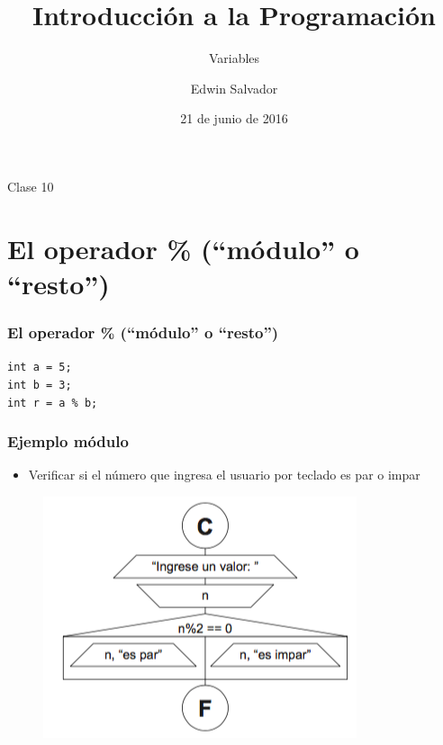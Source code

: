 \documentclass[handout]{beamer}
\title{Introducción a la Programación}
\subtitle{Variables}
\author{Edwin Salvador}
\date{21 de junio de 2016}
\begin{document}
  \begin{frame}
    \titlepage
    \centerline{Clase 10}
  \end{frame}
  

\section{El operador \% (``módulo'' o ``resto'')} %
\label{sec:el_operador__modulo_o_resto_}
\begin{frame}[t]\frametitle{El operador \% (``módulo'' o ``resto'')}
    
\texttt{int a = 5;}\\
\texttt{int b = 3;} \\
\texttt{int r = a \% b;}


\end{frame}

\begin{frame}[t]\frametitle{Ejemplo módulo}
    \begin{itemize}
      \item Verificar si el número que ingresa el usuario por teclado es par o impar       
    \end{itemize}

    \begin{figure}[tb]
      \centering
      \includegraphics[scale=.7]{./img/mod}
    \end{figure}

\end{frame}
\end{document}
